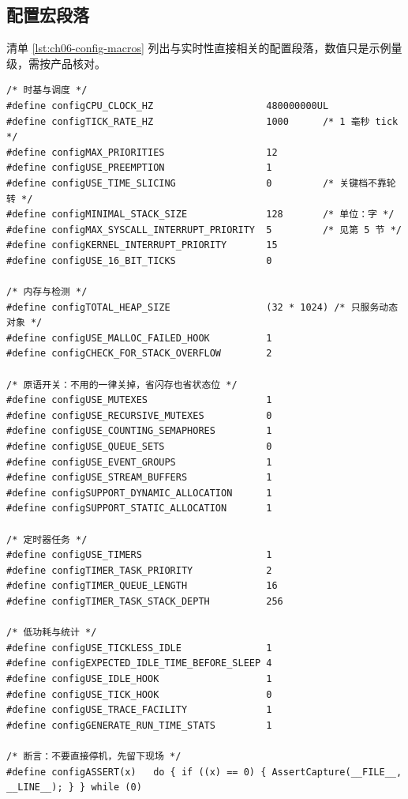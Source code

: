 \documentclass[12pt,a4paper,fontset=fandol]{ctexbook}
\begin{document}
\subsection{配置宏段落}

清单 \ref{lst:ch06-config-macros} 列出与实时性直接相关的配置段落，数值只是示例量级，需按产品核对。

\begin{lstlisting}[style=cstyle,caption={C：FreeRTOSConfig.h 中与实时性直接相关的宏段落（数值为示例量级）},label={lst:ch06-config-macros}]
/* 时基与调度 */
#define configCPU_CLOCK_HZ                    480000000UL
#define configTICK_RATE_HZ                    1000      /* 1 毫秒 tick */
#define configMAX_PRIORITIES                  12
#define configUSE_PREEMPTION                  1
#define configUSE_TIME_SLICING                0         /* 关键档不靠轮转 */
#define configMINIMAL_STACK_SIZE              128       /* 单位：字 */
#define configMAX_SYSCALL_INTERRUPT_PRIORITY  5         /* 见第 5 节 */
#define configKERNEL_INTERRUPT_PRIORITY       15
#define configUSE_16_BIT_TICKS                0

/* 内存与检测 */
#define configTOTAL_HEAP_SIZE                 (32 * 1024) /* 只服务动态对象 */
#define configUSE_MALLOC_FAILED_HOOK          1
#define configCHECK_FOR_STACK_OVERFLOW        2

/* 原语开关：不用的一律关掉，省闪存也省状态位 */
#define configUSE_MUTEXES                     1
#define configUSE_RECURSIVE_MUTEXES           0
#define configUSE_COUNTING_SEMAPHORES         1
#define configUSE_QUEUE_SETS                  0
#define configUSE_EVENT_GROUPS                1
#define configUSE_STREAM_BUFFERS              1
#define configSUPPORT_DYNAMIC_ALLOCATION      1
#define configSUPPORT_STATIC_ALLOCATION       1

/* 定时器任务 */
#define configUSE_TIMERS                      1
#define configTIMER_TASK_PRIORITY             2
#define configTIMER_QUEUE_LENGTH              16
#define configTIMER_TASK_STACK_DEPTH          256

/* 低功耗与统计 */
#define configUSE_TICKLESS_IDLE               1
#define configEXPECTED_IDLE_TIME_BEFORE_SLEEP 4
#define configUSE_IDLE_HOOK                   1
#define configUSE_TICK_HOOK                   0
#define configUSE_TRACE_FACILITY              1
#define configGENERATE_RUN_TIME_STATS         1

/* 断言：不要直接停机，先留下现场 */
#define configASSERT(x)   do { if ((x) == 0) { AssertCapture(__FILE__, __LINE__); } } while (0)
\end{lstlisting}
\end{document}
